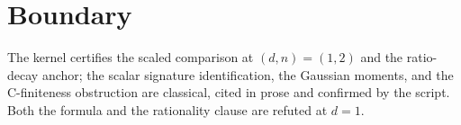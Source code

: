 \documentclass[11pt]{article}
\begin{document}
\section{Boundary}

The kernel certifies the scaled comparison at $(d, n) = (1, 2)$ and
the ratio-decay anchor; the scalar signature identification, the
Gaussian moments, and the C-finiteness obstruction are classical,
cited in prose and confirmed by the script.  Both the formula and
the rationality clause are refuted at $d = 1$.
\end{document}
